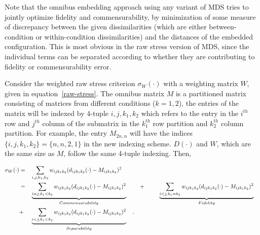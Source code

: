 \documentclass[12pt,oneside,final]{thesis}\usepackage[]{graphicx}\usepackage[]{color}
\begin{document}
   



Note that the omnibus embedding approach using any variant of MDS tries to jointly optimize fidelity and commensurability, by minimization of some measure of discrepancy between the given dissimilarities (which are either between-condition or within-condition dissimilarities) and the distances of the embedded configuration. This is most obvious in the  raw stress version of  MDS, since the individual terms can be separated according to whether they are contributing to  fidelity or  commensurability  error.

 Consider the weighted raw stress criterion $\sigma_{W}(\cdot)$ with a weighting matrix $W$, given in equation~\eqref{raw-stress}.
 The omnibus matrix $M$  is a partitioned matrix consisting of matrices from different conditions ($k={1,2}$),  the entries of the matrix will be indexed by 4-tuple ${i,j,k_1,k_2}$ which refers to the entry in the $i^{th}$ row and $j^{th}$ column of the submatrix in  the $k_1^{th}$  row partition and   $k_2^{th}$ column partition. For example, the entry ${M}_{2n,n}$ will have the indices $\{i,j,k_1,k_2\}=\{n,n,2,1\}$ in the new indexing scheme. $D(\cdot)$ and $W$, which are the same size as $M$, follow the same 4-tuple indexing. Then,
 
\begin{align}
\sigma_W(\cdot)  &= & &\sum_{i,j,k_1,k_2} {w_{ij{k_1}{k_2}}(d_{ij{k_1}{k_2}}(\cdot)-M_{ijk_1k_2})^2 } \notag\\
\hspace{3pt} &=& &\underbrace{\sum_{i=j,k_1<k_2}  {w_{ij{k_1}{k_2}}(d_{ij{k_1}{k_2}}(\cdot)-M_{ijk_1k_2})^2}}_{Commensurability}  \hspace{10pt}  &  + &\hspace{2.5em} \underbrace{\sum_{i<j,k_1=k_2}  {w_{ij{k_1}{k_2}}(d_{ij{k_1}{k_2}}(\cdot)-M_{ijk_1k_2})^2  }  } _{Fidelity}\notag\\
\hspace{3pt}&+&  &\underbrace{\sum_{i< j,k_1<k_2}  {w_{ij{k_1}{k_2}}(d_{ij{k_1}{k_2}}(\cdot)-M_{ijk_1k_2})^2  }  } _{Separability}\label{eq:FidCommSep}\hspace{10pt} .
\end{align}
\end{document}
